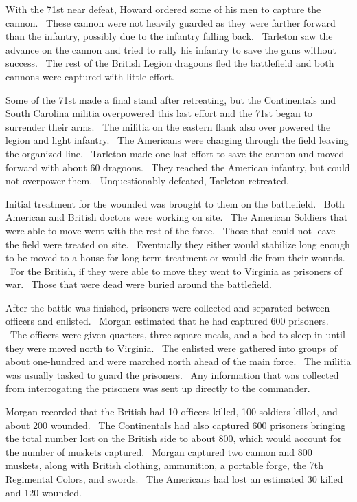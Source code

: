 With the 71st near defeat, Howard ordered some of his men to capture the cannon.
 These cannon were not heavily guarded as they were farther forward than the
infantry, possibly due to the infantry falling back.  Tarleton saw the advance
on the cannon and tried to rally his infantry to save the guns without success.
 The rest of the British Legion dragoons fled the battlefield and both cannons
were captured with little effort.  

Some of the 71st made a final stand after retreating, but the Continentals and
South Carolina militia overpowered this last effort and the 71st began to
surrender their arms.  The militia on the eastern flank also over powered the
legion and light infantry.  The Americans were charging through the field
leaving the organized line.  Tarleton made one last effort to save the cannon
and moved forward with about 60 dragoons.  They reached the American infantry,
but could not overpower them.  Unquestionably defeated, Tarleton retreated.

Initial treatment for the wounded was brought to them on the battlefield.  Both
American and British doctors were working on site.  The American Soldiers that
were able to move went with the rest of the force.  Those that could not leave
the field were treated on site.  Eventually they either would stabilize long
enough to be moved to a house for long-term treatment or would die from their
wounds.  For the British, if they were able to move they went to Virginia as
prisoners of war.  Those that were dead were buried around the battlefield.

After the battle was finished, prisoners were collected and separated between
officers and enlisted.  Morgan estimated that he had captured 600 prisoners.
 The officers were given quarters, three square meals, and a bed to sleep in
until they were moved north to Virginia.  The enlisted were gathered into groups
of about one-hundred and were marched north ahead of the main force.  The
militia was usually tasked to guard the prisoners.  Any information that was
collected from interrogating the prisoners was sent up directly to the
commander.  

Morgan recorded that the British had 10 officers killed, 100 soldiers killed,
and about 200 wounded.  The Continentals had also captured 600 prisoners
bringing the total number lost on the British side to about 800, which would
account for the number of muskets captured.  Morgan captured two cannon and 800
muskets, along with British clothing, ammunition, a portable forge, the 7th
Regimental Colors, and swords.  The Americans had lost an estimated 30 killed
and 120 wounded.

